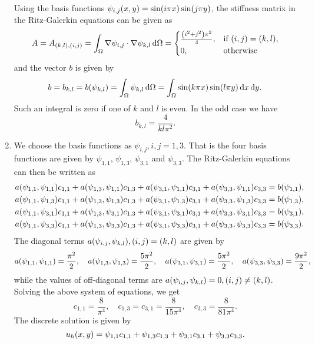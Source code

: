 \documentclass[english]{exercise}
\begin{document}
\begin{enumerate}
		Using the basis functions \(\psi_{i, j}\parentheses*{x, y} = \sin\parentheses*{i\pi x}\sin\parentheses*{j\pi y}\), the stiffness matrix in the Ritz-Galerkin equations can be given as
		\[
			A = A_{\parentheses*{k, l}, \parentheses*{i, j}} = \int_\Omega \nabla\psi_{i, j} \cdot \nabla\psi_{k, l}\d\Omega = \begin{cases}
				\frac{\parentheses*{i^2 + j^2}\pi^2}{4}, & \text{if }\parentheses*{i, j} = \parentheses*{k, l},\\
				0, & \text{otherwise}
			\end{cases}
		\]
		and the vector \(b\) is given by
		\[
			b = b_{k, l} = b\parentheses*{\psi_{k, l}} = \int_\Omega \psi_{k, l}\d\Omega = \int_\Omega \sin\parentheses*{k\pi x}\sin\parentheses*{l\pi y}\d x\d y.
		\]
		Such an integral is zero if one of \(k\) and \(l\) is even.
		In the odd case we have
		\[
			b_{k, l} = \frac{4}{kl\pi^2}.
		\]
		\item We choose the basis functions as \(\psi_{i, j}, i, j = 1, 3\).
		That is the four basis functions are given by \(\psi_{1, 1}\), \(\psi_{1, 3}\), \(\psi_{3, 1}\) and \(\psi_{3, 3}\).
		The Ritz-Galerkin equations can then be written as
		\begin{align*}
			a\parentheses*{\psi_{1, 1}, \psi_{1, 1}}c_{1, 1} + a\parentheses*{\psi_{1, 3}, \psi_{1, 1}}c_{1, 3} + a\parentheses*{\psi_{3, 1}, \psi_{1, 1}}c_{3, 1} + a\parentheses*{\psi_{3, 3}, \psi_{1, 1}}c_{3, 3} &= b\parentheses*{\psi_{1, 1}},\\
			a\parentheses*{\psi_{1, 1}, \psi_{1, 3}}c_{1, 1} + a\parentheses*{\psi_{1, 3}, \psi_{1, 3}}c_{1, 3} + a\parentheses*{\psi_{3, 1}, \psi_{1, 3}}c_{3, 1} + a\parentheses*{\psi_{3, 3}, \psi_{1, 3}}c_{3, 3} &= b\parentheses*{\psi_{1, 3}},\\
			a\parentheses*{\psi_{1, 1}, \psi_{3, 1}}c_{1, 1} + a\parentheses*{\psi_{1, 3}, \psi_{3, 1}}c_{1, 3} + a\parentheses*{\psi_{3, 1}, \psi_{3, 1}}c_{3, 1} + a\parentheses*{\psi_{3, 3}, \psi_{3, 1}}c_{3, 3} &= b\parentheses*{\psi_{3, 1}},\\
			a\parentheses*{\psi_{1, 1}, \psi_{3, 3}}c_{1, 1} + a\parentheses*{\psi_{1, 3}, \psi_{3, 3}}c_{1, 3} + a\parentheses*{\psi_{3, 1}, \psi_{3, 3}}c_{3, 1} + a\parentheses*{\psi_{3, 3}, \psi_{3, 3}}c_{3, 3} &= b\parentheses*{\psi_{3, 3}}.
		\end{align*}
		The diagonal terms \(a\parentheses*{\psi_{i, j}, \psi_{k, l}}, \parentheses*{i, j} = \parentheses*{k, l}\) are given by
		\[
			a\parentheses*{\psi_{1, 1}, \psi_{1, 1}} = \frac{\pi^2}{2}, \quad a\parentheses*{\psi_{1, 3}, \psi_{1, 3}} = \frac{5\pi^2}{2}, \quad a\parentheses*{\psi_{3, 1}, \psi_{3, 1}} = \frac{5\pi^2}{2}, \quad a\parentheses*{\psi_{3, 3}, \psi_{3, 3}} = \frac{9\pi^2}{2},
		\]
		while the values of off-diagonal terms are \(a\parentheses*{\psi_{i, j}, \psi_{k, l}} = 0, \parentheses*{i, j} \ne \parentheses*{k, l}\).
		Solving the above system of equations, we get
		\[
			c_{1, 1} = \frac{8}{\pi^4}, \quad c_{1, 3} = c_{3, 1} = \frac{8}{15\pi^4}, \quad c_{3, 3} = \frac{8}{81\pi^4}.
		\]
		The discrete solution is given by
		\[
			u_h\parentheses*{x, y} = \psi_{1, 1}c_{1, 1} + \psi_{1, 3}c_{1, 3} + \psi_{3, 1}c_{3, 1} + \psi_{3, 3}c_{3, 3}.
		\]
	\end{enumerate}
\end{document}
